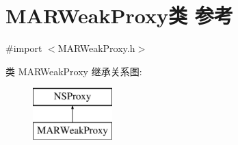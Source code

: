 \hypertarget{interface_m_a_r_weak_proxy}{}\section{M\+A\+R\+Weak\+Proxy类 参考}
\label{interface_m_a_r_weak_proxy}


{\ttfamily \#import $<$M\+A\+R\+Weak\+Proxy.\+h$>$}

类 M\+A\+R\+Weak\+Proxy 继承关系图\+:\begin{figure}[H]
\begin{center}
\leavevmode
\includegraphics[height=2.000000cm]{interface_m_a_r_weak_proxy}
\end{center}
\end{figure}
